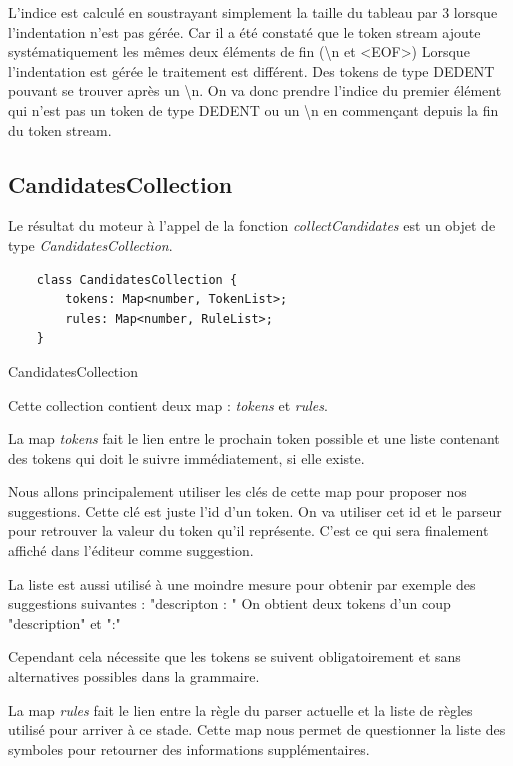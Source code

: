 \documentclass[
    iict, %
    il, %
]{heig-tb}
\begin{document}
L'indice est calculé en soustrayant simplement la taille du tableau par 3 lorsque l'indentation n'est pas gérée. Car il a été constaté que le token stream ajoute systématiquement les mêmes deux éléments de fin (\textbackslash n et <EOF>)
Lorsque l'indentation est gérée le traitement est différent. Des tokens de type DEDENT pouvant se trouver après un \textbackslash n. On va donc prendre l'indice du premier élément qui n'est pas un token de type DEDENT ou un \textbackslash n en commençant depuis la fin du token stream.

\subsection{CandidatesCollection}

Le résultat du moteur à l'appel de la fonction \emph{collectCandidates} est un objet de type \emph{CandidatesCollection}.

\begin{listing}[!ht]
    \begin{verbatim}
    class CandidatesCollection {
        tokens: Map<number, TokenList>;
        rules: Map<number, RuleList>;
    }
    \end{verbatim}
    \caption{CandidatesCollection}
    \label{CandidatesCollection}
\end{listing}

Cette collection contient deux map : \emph{tokens} et \emph{rules}.

La map \emph{tokens} fait le lien entre le prochain token possible et une liste contenant des tokens qui doit le suivre immédiatement, si elle existe.

Nous allons principalement utiliser les clés de cette map pour proposer nos suggestions.
Cette clé est juste l'id d'un token. On va utiliser cet id et le parseur pour retrouver la valeur du token qu'il représente. C'est ce qui sera finalement affiché dans l'éditeur comme suggestion.

La liste est aussi utilisé à une moindre mesure pour obtenir par exemple des suggestions suivantes : "descripton : "
On obtient deux tokens d'un coup "description" et ":"

Cependant cela nécessite que les tokens se suivent obligatoirement et sans alternatives possibles dans la grammaire.

La map \emph{rules} fait le lien entre la règle du parser actuelle et la liste de règles utilisé pour arriver à ce stade.
Cette map nous permet de questionner la liste des symboles pour retourner des informations supplémentaires.
\end{document}
